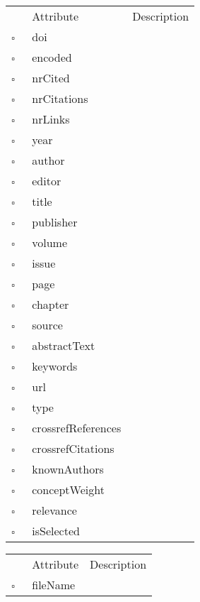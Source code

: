 \begin{table}
\caption{MissingWork  }

\begin{longtable}{llp{8cm}}
& Attribute & Description \\
$\square$\ & doi &  \\
$\square$\ & encoded &  \\
$\square$\ & nrCited &  \\
$\square$\ & nrCitations &  \\
$\square$\ & nrLinks &  \\
$\square$\ & year &  \\
$\square$\ & author &  \\
$\square$\ & editor &  \\
$\square$\ & title &  \\
$\square$\ & publisher &  \\
$\square$\ & volume &  \\
$\square$\ & issue &  \\
$\square$\ & page &  \\
$\square$\ & chapter &  \\
$\square$\ & source &  \\
$\square$\ & abstractText &  \\
$\square$\ & keywords &  \\
$\square$\ & url &  \\
$\square$\ & type &  \\
$\square$\ & crossrefReferences &  \\
$\square$\ & crossrefCitations &  \\
$\square$\ & knownAuthors &  \\
$\square$\ & conceptWeight &  \\
$\square$\ & relevance &  \\
$\square$\ & isSelected &  \\
\end{longtable}
\label{attr:MissingWork}
\end{table}

\begin{table}
\caption{Orphan  }

\begin{longtable}{llp{8cm}}
& Attribute & Description \\
$\square$\ & fileName &  \\
\end{longtable}
\label{attr:Orphan}
\end{table}

